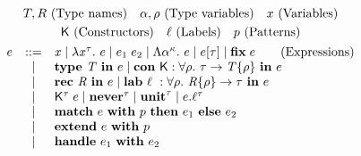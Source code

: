 \begin{gather*}
  T,R~\text{(Type names)}\quad \alpha,\rho~\text{(Type variables)} \quad x~\text{(Variables)}  \\
  \fnlab{K}~\text{(Constructors)} \quad \ell~\text{(Labels)} \quad p~\text{(Patterns)} \\
  \begin{array}{lcl}
    e &::=& \tmvar{x} \mid \tmlam{x}{\tau}{e} \mid \tmapp{e_1}{e_2} \mid \tmtylam{\alpha}{\kappa}{e} \mid \tmtyapp{e}{\tau} \mid \tmfix{e} \qquad\hfill\text{(Expressions)}\\
           & \mid & \tmtype{T}{e} \mid \tmcondef{K}{\rho}{\tau}{T}{e} \\
           & \mid & \tmrec{R}{e} \mid \tmlabdef{\ell}{\rho}{R}{\tau}{e} \\
           & \mid & \tmconapp{K}{\tau}{e} \mid \tmnever{\tau} \mid \tmunit{\tau} \mid \tmlabproj{e}{\ell}{\tau} \\
           & \mid & \tmmatch{e}{p}{e_1}{e_2} \\
           & \mid & \tmext{e}{p} \\
           & \mid & \tmhandle{e_1}{e_2} \\[1mm]
  \end{array}
\end{gather*}
